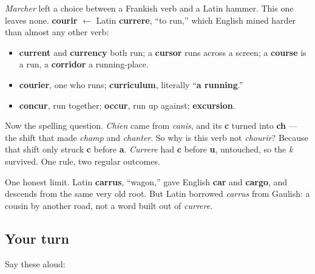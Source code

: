 \begin{cousinweb}
\emph{Marcher} left a choice between a Frankish verb and a Latin hammer. This one leaves none. \textbf{courir} $\leftarrow$ Latin \textbf{currere}, \textquotedblleft{}to run,\textquotedblright{} which English mined harder than almost any other verb:

\begin{itemize}
\raggedright
  \item \textbf{current} and \textbf{currency} both run; a \textbf{cursor} runs across a screen; a \textbf{course} is a run, a \textbf{corridor} a running-place.
  \item \textbf{courier}, one who runs; \textbf{curriculum}, literally \textquotedblleft{}\textbf{a running}.\textquotedblright{}
  \item \textbf{concur}, run together; \textbf{occur}, run up against; \textbf{excursion}.
\end{itemize}

Now the spelling question. \emph{Chien} came from \emph{canis}, and its \textbf{c} turned into \textbf{ch} — the shift that made \emph{champ} and \emph{chanter}. So why is this verb not \emph{chourir}? Because that shift only struck \textbf{c} before \textbf{a}. \emph{Currere} had \textbf{c} before \textbf{u}, untouched, so the \emph{k} survived. One rule, two regular outcomes.

One honest limit. Latin \textbf{carrus}, \textquotedblleft{}wagon,\textquotedblright{} gave English \textbf{car} and \textbf{cargo}, and descends from the same very old root. But Latin borrowed \emph{carrus} from Gaulish: a cousin by another road, not a word built out of \emph{currere}.
\end{cousinweb}

\subsection*{Your turn}
Say these aloud:

